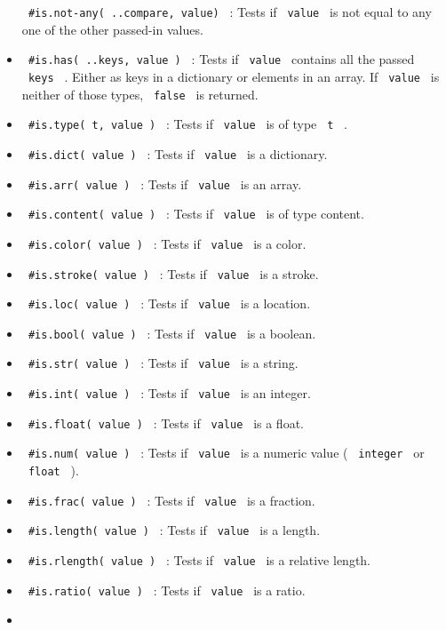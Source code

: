 \begin{itemize}
  \texttt{\ \#is.not-any(\ ..compare,\ value)\ } : Tests if
  \texttt{\ value\ } is not equal to any one of the other passed-in
  values.
\item
  \texttt{\ \#is.has(\ ..keys,\ value\ )\ } : Tests if
  \texttt{\ value\ } contains all the passed \texttt{\ keys\ } . Either
  as keys in a dictionary or elements in an array. If \texttt{\ value\ }
  is neither of those types, \texttt{\ false\ } is returned.
\item
  \texttt{\ \#is.type(\ t,\ value\ )\ } : Tests if \texttt{\ value\ } is
  of type \texttt{\ t\ } .
\item
  \texttt{\ \#is.dict(\ value\ )\ } : Tests if \texttt{\ value\ } is a
  dictionary.
\item
  \texttt{\ \#is.arr(\ value\ )\ } : Tests if \texttt{\ value\ } is an
  array.
\item
  \texttt{\ \#is.content(\ value\ )\ } : Tests if \texttt{\ value\ } is
  of type content.
\item
  \texttt{\ \#is.color(\ value\ )\ } : Tests if \texttt{\ value\ } is a
  color.
\item
  \texttt{\ \#is.stroke(\ value\ )\ } : Tests if \texttt{\ value\ } is a
  stroke.
\item
  \texttt{\ \#is.loc(\ value\ )\ } : Tests if \texttt{\ value\ } is a
  location.
\item
  \texttt{\ \#is.bool(\ value\ )\ } : Tests if \texttt{\ value\ } is a
  boolean.
\item
  \texttt{\ \#is.str(\ value\ )\ } : Tests if \texttt{\ value\ } is a
  string.
\item
  \texttt{\ \#is.int(\ value\ )\ } : Tests if \texttt{\ value\ } is an
  integer.
\item
  \texttt{\ \#is.float(\ value\ )\ } : Tests if \texttt{\ value\ } is a
  float.
\item
  \texttt{\ \#is.num(\ value\ )\ } : Tests if \texttt{\ value\ } is a
  numeric value ( \texttt{\ integer\ } or \texttt{\ float\ } ).
\item
  \texttt{\ \#is.frac(\ value\ )\ } : Tests if \texttt{\ value\ } is a
  fraction.
\item
  \texttt{\ \#is.length(\ value\ )\ } : Tests if \texttt{\ value\ } is a
  length.
\item
  \texttt{\ \#is.rlength(\ value\ )\ } : Tests if \texttt{\ value\ } is
  a relative length.
\item
  \texttt{\ \#is.ratio(\ value\ )\ } : Tests if \texttt{\ value\ } is a
  ratio.
\item

\end{itemize}
